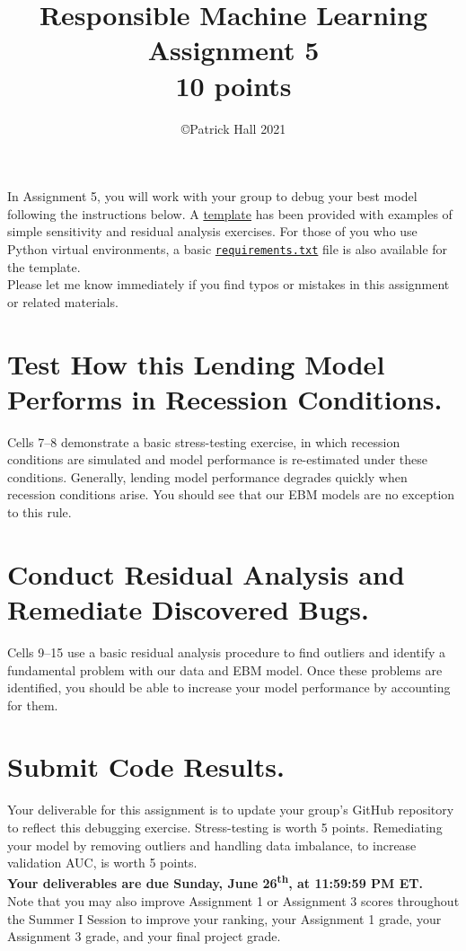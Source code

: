 \documentclass[fleqn]{article}
\title{Responsible Machine Learning\\\Large{Assignment 5}\\\Large{10 points}}
\author{\copyright Patrick Hall 2021}
\begin{document}
\maketitle

\noindent In Assignment 5, you will work with your group to debug your best model following the instructions below. A \href{https://nbviewer.jupyter.org/github/jphall663/GWU_rml/blob/master/assignments/assignment_5/assign_5_template.ipynb?flush_cache=true}{template} has been provided with examples of simple sensitivity and residual analysis exercises. For those of you who use Python virtual environments, a basic \href{https://github.com/jphall663/GWU_rml/blob/master/assignments/requirements.txt}{\texttt{requirements.txt}} file is also available for the template.\\

\noindent Please let me know immediately if you find typos or mistakes in this assignment or related materials. 

\section{Test How this Lending Model Performs in Recession Conditions.}

Cells 7--8 demonstrate a basic stress-testing exercise, in which recession conditions are simulated and model performance is re-estimated under these conditions. Generally, lending model performance degrades quickly when recession conditions arise. You should see that our EBM models are no exception to this rule.\\

\section{Conduct Residual Analysis and Remediate Discovered Bugs.}

Cells 9--15 use a basic residual analysis procedure to find outliers and identify a fundamental problem with our data and EBM model. Once these problems are identified, you should be able to increase your model performance by accounting for them.\\

\section{Submit Code Results.}

Your deliverable for this assignment is to update your group's GitHub repository to reflect this debugging exercise. Stress-testing is worth 5 points. Remediating your model by removing outliers and handling data imbalance, to increase validation AUC, is worth 5 points.\\

\noindent \textbf{Your deliverables are due Sunday, June 26\textsuperscript{th}, at 11:59:59 PM ET.}\\

\noindent Note that you may also improve Assignment 1 or Assignment 3 scores throughout the Summer I Session to improve your ranking, your Assignment 1 grade, your Assignment 3 grade, and your final project grade.
\end{document}
